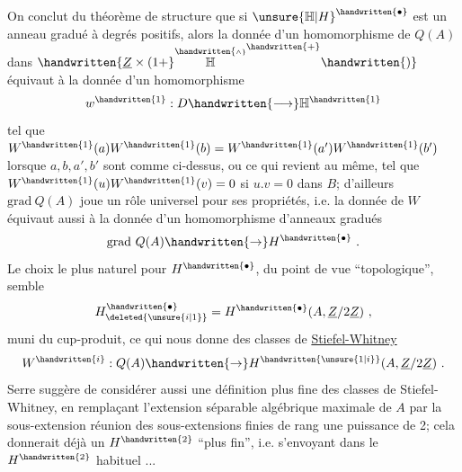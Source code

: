 On conclut du  théorème de structure que si ${\unsure{\mathbb{H}|H}}^{\handwritten{\bullet}}$ est un anneau gradué à degrés positifs, alors la donnée d'un homomorphisme  de $Q(A)$ dans $\handwritten{\underline{Z}\times(1+}\overset{\handwritten{\scriptscriptstyle\wedge}}{\mathbb{H}}^{\handwritten{+}}\handwritten{)}$ équivaut à la donnée d'un homomorphisme
\[
w^{\handwritten{1}}:D\handwritten{\longrightarrow}\mathbb{H}^{\handwritten{1}}
\]
tel que $W^{\handwritten{1}}(a)W^{\handwritten{1}}(b)=W^{\handwritten{1}}(a')W^{\handwritten{1}}(b')$ lorsque $a,b,a',b'$ sont comme ci-dessus, ou ce qui revient au même, tel que $W^{\handwritten{1}}(u)W^{\handwritten{1}}(v)=0$ si $u.v=0$ dans $B$;  d'ailleurs $\mathrm{grad}\ Q(A)$ joue un rôle universel pour ses propriétés, i.e. la donnée de $W$ équivaut aussi à la donnée d'un homomorphisme  d'anneaux gradués
\[
\mathrm{grad}\ Q(A)\handwritten{\to}H^{\handwritten{\bullet}}\ .
\]
Le choix le plus naturel pour $H^{\handwritten{\bullet}}$, du point de vue ``topologique'', semble
\[
H_{\deleted{\unsure{i|1}}}^{\handwritten{\bullet}}=H^{\handwritten{\bullet}}(A,\underline{Z}/2\underline{Z})\ ,
\]
muni du cup-produit, ce qui nous donne des classes de \uline{Stiefel-Whitney}
\[
W^{\handwritten{i}}:Q(A)\handwritten{\to}H^{\handwritten{\unsure{1|i}}}(A,\underline{Z}/2\underline{Z})\ .
\]
Serre suggère de  considérer aussi une définition plus fine des classes de Stiefel-Whitney, en remplaçant  l'extension séparable algébrique maximale de $A$ par la sous-extension réunion des sous-extensions finies de rang une puissance de 2; cela donnerait déjà un $H^{\handwritten{2}}$ ``plus fin'', i.e. s'envoyant dans le $H^{\handwritten{2}}$ habituel ...
